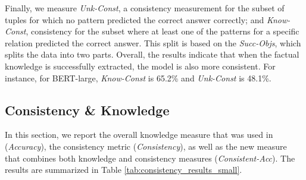 Finally, we measure \emph{Unk-Const}, a consistency measurement for the subset of tuples
for which no pattern predicted the correct answer correctly;
and \emph{Know-Const}, consistency for the subset where
at least one of the patterns for a specific
relation predicted the correct answer. This split is based on the \textit{Succ-Objs}, which splits the data into two parts.
Overall, the results indicate that when the factual knowledge is successfully extracted, the model is also more consistent.
For instance, for BERT-large, \textit{Know-Const}  is 65.2\% and \textit{Unk-Const} is 48.1\%. 




\subsection{Consistency \& Knowledge}
 In this section, we report
the overall knowledge measure that was used in \citet{lama} (\textit{Accuracy}),
the consistency metric (\textit{Consistency}), as well as the new measure that combines both knowledge and consistency measures (\textit{Consistent-Acc}). %
The results are summarized in Table
\ref{tab:consistency_results_small}.

